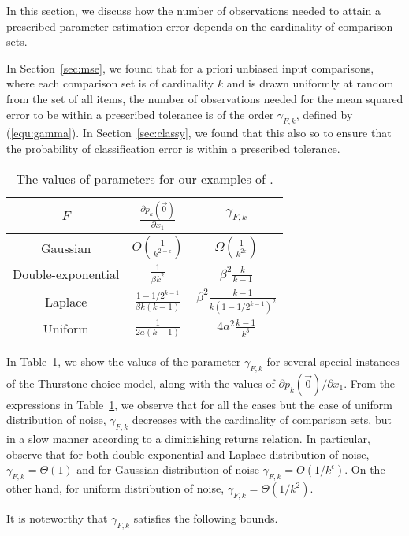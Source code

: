 
In this section, we discuss how the number of observations needed to attain a prescribed parameter estimation error depends on the cardinality of comparison sets. 

In Section~\ref{sec:mse}, we found that for a priori unbiased input comparisons, where each comparison set is of cardinality $k$ and is drawn uniformly at random from the set of all items, the number of observations needed for the mean squared error to be within a prescribed tolerance is of the order $\gamma_{F,k}$, defined by (\ref{equ:gamma}). In Section~\ref{sec:classy}, we found that this also so to ensure that the probability of classification error is within a prescribed tolerance. 

\begin{table}[h]
\caption{The values of parameters for our examples of \GT.}
\begin{center}
\begin{tabular}{c|cc}
$F$ & $\frac{\partial p_k(\vec{0})}{\partial x_1}$ & $\gamma_{F,k}$\\\hline
Gaussian & $O(\frac{1}{k^{2 - \epsilon}})$ & $\Omega(\frac{1}{k^{2\epsilon}})$\\
Double-exponential & $\frac{1}{\beta k^2}$ & $\beta^2\frac{k}{k-1}$\\
Laplace & $\frac{1-1/2^{k-1}}{\beta k(k-1)}$ & $\beta^2\frac{k-1}{k(1-1/2^{k-1})^2}$\\
Uniform & $\frac{1}{2a(k-1)}$ & $4a^2\frac{k-1}{k^3}$
\end{tabular}
\end{center}
\label{tab:gamma}
\end{table}

In Table~\ref{tab:gamma}, we show the values of the parameter $\gamma_{F,k}$ for several special instances of the Thurstone choice model, along with the values of $\partial p_k(\vec{0})/\partial x_1$. From the expressions in Table~\ref{tab:gamma}, we observe that for all the cases but the case of uniform distribution of noise, $\gamma_{F,k}$ decreases with the cardinality of comparison sets, but in a slow manner according to a diminishing returns relation. In particular, observe that for both double-exponential and Laplace distribution of noise, $\gamma_{F,k} = \Theta(1)$ and for Gaussian distribution of noise $\gamma_{F,k} = O(1/k^\epsilon)$. On the other hand, for uniform distribution of noise, $\gamma_{F,k} = \Theta(1/k^2)$. 

It is noteworthy that $\gamma_{F,k}$ satisfies the following bounds.

